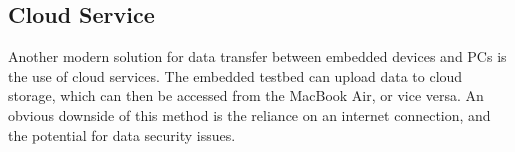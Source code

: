 \subsection{Cloud Service}
Another modern solution for data transfer between embedded devices and PCs is the use of cloud services. The embedded testbed can upload data to cloud storage, which can then be accessed from the MacBook Air, or vice versa. An obvious downside of this method is the reliance on an internet connection, and the potential for data security issues. 





